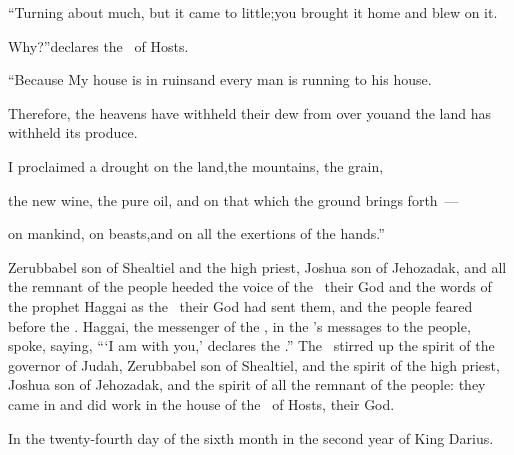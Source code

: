 \begin{inparaenum}
  \pc {} ``Turning about much, but it came to little;\pa you brought it home and blew on it.%
  
  \pd Why?''\pa declares the \lord\ of Hosts.%
  
  \pd ``Because My house is in ruins\pa and every man is running to his house.%
  
  \pc {} Therefore, the heavens have withheld their dew from over you\pa and the land has withheld its produce.%
  
  \pc {} I proclaimed a drought on the land,\pa the mountains, the grain,%
  
  \pd the new wine,%
  the pure oil,%
  \pa and on%
  that which the ground brings forth~---%
  
  \pd on mankind, on beasts,\pa and on all the exertions of the hands.''\bigskip%
  
   Zerubbabel son of Shealtiel and the high priest, Joshua son of Jehozadak, and all the remnant of the people heeded the voice of the \lord\ their God and the words of the prophet Haggai as the \lord\ their God had sent them, and the people feared before the \lord.%
   Haggai, the messenger of the \lord, in the \lord's messages to the people, spoke, saying,\hspace*{2em} ``\thinspace`I am with you,' declares the \lord.''%
   The \lord\ stirred up the spirit of the governor of Judah, Zerubbabel son of Shealtiel, and the spirit of the high priest, Joshua son of Jehozadak, and the spirit of all the remnant of the people: they came in and did work in the house of the \lord\ of Hosts, their God.\smallskip%
  
  \pc {} In the twenty-fourth day of the sixth month in the second year of King Darius.%
\end{inparaenum}
